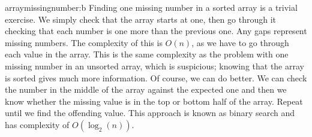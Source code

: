\begin{subanswer}{arraymissingnumber:b}
Finding one missing number in a sorted array is a trivial exercise.
We simply check that the array starts at one, then go through it checking that each number is one more than the previous one.
Any gaps represent missing numbers.
The complexity of this is $O(n)$, as we have to go through each value in the array.
This is the same complexity as the problem with one missing number in an unsorted array, which is suspicious; knowing that the array is sorted gives much more information.
Of course, we can do better.
We can check the number in the middle of the array against the expected one and then we know whether the missing value is in the top or bottom half of the array.
Repeat until we find the offending value.
This approach is known as binary search and has complexity of $O(\log_2(n))$.
\end{subanswer}
